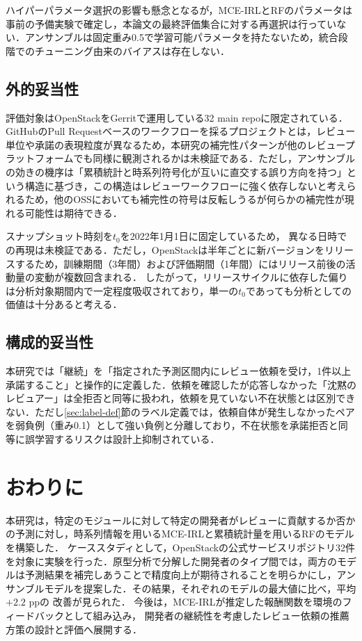 \documentclass[submit,noauthor,ses,dvipdfmx]{ipsj}
\begin{document}
ハイパーパラメータ選択の影響も懸念となるが，MCE-IRLとRFのパラメータは事前の予備実験で確定し，本論文の最終評価集合に対する再選択は行っていない．アンサンブルは固定重み0.5で学習可能パラメータを持たないため，統合段階でのチューニング由来のバイアスは存在しない．

\subsection{外的妥当性}
評価対象はOpenStackをGerritで運用している32 main repoに限定されている．GitHubのPull Requestベースのワークフローを採るプロジェクトとは，レビュー単位や承諾の表現粒度が異なるため，本研究の補完性パターンが他のレビュープラットフォームでも同様に観測されるかは未検証である．ただし，アンサンブルの効きの機序は「累積統計と時系列符号化が互いに直交する誤り方向を持つ」という構造に基づき，この構造はレビューワークフローに強く依存しないと考えられるため，他のOSSにおいても補完性の符号は反転しうるが何らかの補完性が現れる可能性は期待できる．


スナップショット時刻を$t_0$を2022年1月1日に固定しているため，
異なる日時での再現は未検証である．ただし，OpenStackは半年ごとに新バージョンをリリースするため，訓練期間（3年間）および評価期間（1年間）にはリリース前後の活動量の変動が複数回含まれる．
したがって，リリースサイクルに依存した偏りは分析対象期間内で一定程度吸収されており，単一の$t_0$であっても分析としての価値は十分あると考える．

\subsection{構成的妥当性}
本研究では「継続」を「指定された予測区間内にレビュー依頼を受け，1件以上承諾すること」と操作的に定義した．依頼を確認したが応答しなかった「沈黙のレビュアー」は全拒否と同等に扱われ，依頼を見ていない不在状態とは区別できない．ただし\ref{sec:label-def}節のラベル定義では，依頼自体が発生しなかったペアを弱負例（重み0.1）として強い負例と分離しており，不在状態を承諾拒否と同等に誤学習するリスクは設計上抑制されている．

\section{おわりに}\label{sec:conclusion}
本研究は，特定のモジュールに対して特定の開発者がレビューに貢献するか否かの予測に対し，時系列情報を用いるMCE-IRLと累積統計量を用いるRFのモデルを構築した．
ケーススタディとして，OpenStackの公式サービスリポジトリ32件を対象に実験を行った．原型分析で分解した開発者のタイプ間では，両方のモデルは予測結果を補完しあうことで精度向上が期待されることを明らかにし，アンサンブルモデルを提案した．その結果，それぞれのモデルの最大値に比べ，平均$+2.2$ ppの
改善が見られた．
今後は，MCE-IRLが推定した報酬関数を環境のフィードバックとして組み込み，
開発者の継続性を考慮したレビュー依頼の推薦方策の設計と評価へ展開する．
\end{document}
